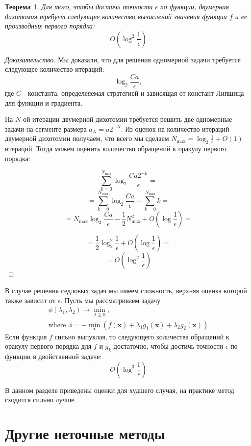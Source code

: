\documentclass[12pt]{article}
\newtheorem{theorem}{Теорема}[section]
\begin{document}
\begin{theorem}
Для того, чтобы достичь точности $\epsilon$ по функции, двумерная дихотомия требует следующее количество вычислений значения функции $f$ и ее производных первого порядка:
$$O\left(\log^2\frac{1}{\epsilon}\right)$$
\end{theorem} 
\begin{proof}[Доказательство]
Мы доказали, что для решения одномерной задачи требуется следующее количество итераций:
$$\log_2\frac{Ca}{\epsilon},$$
где $C$ - константа, определеяемая стратегией и зависящая от констант Липшица для функции и градиента.

На $N$-ой итерации двумерной дихотомии требуется решить две одномерные задачи на сегменте размера $a_N=a2^{-N}$. Из оценок на количество итераций двумерной дихотомии получаем, что всего мы сделаем $N_{\max}=\log_2\frac{1}{\epsilon}+O(1)$ итераций. Тогда можем оценить количество обращений к оракулу первого порядка:

$$\sum_{k=0}^{N_{\max}}\log_2\frac{Ca2^{-k}}{\epsilon} = $$
$$= \sum_{k=0}^{N_{\max}}\log_2\frac{Ca}{\epsilon} - \sum_{k=0}^{N_{\max}}k=$$
$$= N_{\max}\log_2\frac{Ca}{\epsilon} - \frac{1}{2}N_{\max}^2 + O\left(\log\frac{1}{\epsilon}\right)=$$

$$= \frac{1}{2}\log_2^2\frac{1}{\epsilon} +O\left(\log\frac{1}{\epsilon}\right)=$$
$$=O\left(\log^2\frac{1}{\epsilon}\right)$$
\end{proof}

В случае решения седловых задач мы имеем сложность, верхняя оценка которой также зависит от $\epsilon$. Пусть мы рассматриваем задачу
\begin{gather}
\phi(\lambda_1, \lambda_2) \rightarrow \min_{\lambda\geq 0},\\
\text{where } \phi = -\min_\textbf{x}\left(f(\textbf{x}) + \lambda_1 g_1(\textbf{x}) + \lambda_2 g_2(\textbf{x})\right)
\end{gather}
Если функция $f$ сильно выпуклая, то следующего количества обращений к оракулу первого порядка для $f$ и $g_k$ достаточно, чтобы достичь точности $\epsilon$ по функции в двойственной задаче:
$$O(\log^3\frac{1}{\epsilon})$$

В данном разделе приведены оценки для худшего случая, на практике метод сходится сильно лучше.

\section{Другие неточные методы}
\label{Inexact}
\end{document}
